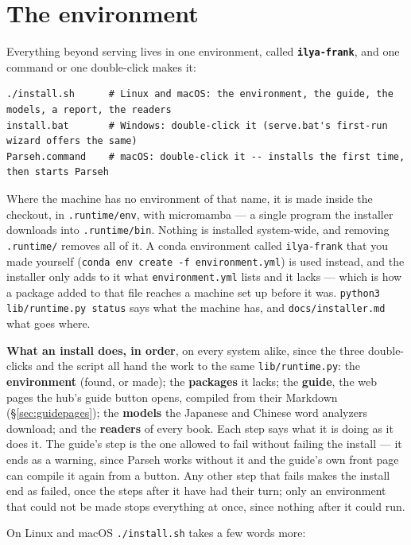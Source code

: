\documentclass[11pt,oneside]{report}
\newcommand{\file}[1]{\texttt{#1}}
\newcommand{\menu}[1]{\textsf{#1}}
\begin{document}
\section{The environment}
\label{sec:install}

Everything beyond serving lives in one environment, called
\textbf{\texttt{ilya-frank}}, and one command or one double-click makes it:

\begin{lstlisting}
./install.sh      # Linux and macOS: the environment, the guide, the models, a report, the readers
install.bat       # Windows: double-click it (serve.bat's first-run wizard offers the same)
Parseh.command    # macOS: double-click it -- installs the first time, then starts Parseh
\end{lstlisting}

Where the machine has no environment of that name, it is made inside the
checkout, in \file{.runtime/env}, with micromamba --- a single program the
installer downloads into \file{.runtime/bin}. Nothing is installed
system-wide, and removing \file{.runtime/} removes all of it. A conda
environment called \texttt{ilya-frank} that you made yourself
(\texttt{conda env create -f environment.yml}) is used instead, and the
installer only adds to it what \file{environment.yml} lists and it lacks ---
which is how a package added to that file reaches a machine set up before
it was. \texttt{python3 lib/runtime.py status} says what the machine has,
and \file{docs/installer.md} what goes where.

\textbf{What an install does, in order}, on every system alike, since the
three double-clicks and the script all hand the work to the same
\file{lib/runtime.py}: the \textbf{environment} (found, or made); the
\textbf{packages} it lacks; the \textbf{guide}, the web pages the hub's
\menu{guide} button opens, compiled from their Markdown
(\S\ref{sec:guidepages}); the \textbf{models} the Japanese and Chinese word
analyzers download; and the \textbf{readers} of every book. Each step says
what it is doing as it does it. The guide's step is the one allowed to fail
without failing the install --- it ends as a warning, since Parseh works
without it and the guide's own front page can compile it again from a
button. Any other step that fails makes the install end as failed, once the
steps after it have had their turn; only an environment that could not be
made stops everything at once, since nothing after it could run.

On Linux and macOS \file{./install.sh} takes a few words more:
\end{document}
